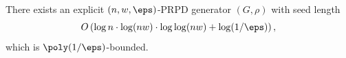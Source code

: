 \begin{THM}
\label{thm:main}
There exists an explicit $(n,w,\eps)$-PRPD generator $(G,\rho)$ with seed length
$$O\left(\log n\cdot \log(nw)\cdot \log\log (nw) + \log(1/\eps)\right),$$
which is $\poly(1/\eps)$-bounded.
\end{THM}
